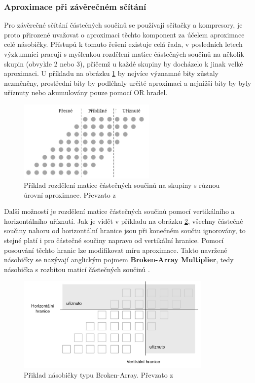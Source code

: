 \subsubsection{Aproximace při závěrečném sčítání}
Pro závěrečné sčítání částečných součinů se používají sčítačky a kompresory, je proto přirozené uvažovat o aproximaci těchto komponent za účelem aproximace celé násobičky. Přístupů k tomuto řešení existuje celá řada, v posledních letech výzkumníci pracují s myšlenkou rozdělení matice částečných součinů na několik skupin (obvykle 2 nebo 3), přičemž u každé skupiny by docházelo k jinak velké aproximaci. U příkladu na obrázku \ref{fig:accumulation_approx} by nejvíce významné bity zůstaly nezměněny, prostřední bity by podléhaly určité aproximaci a nejnižší bity by byly uříznuty nebo akumulovány pouze pomocí OR hradel.

\begin{figure}[H]
    \centering
    \includegraphics[width=0.6\textwidth]{obrazky-figures/accumulation_approx.png}
    \caption{Příklad rozdělení matice částečných součinů na skupiny s různou úrovní aproximace. Převzato z \cite{approx_mult_survey}}
    \label{fig:accumulation_approx}
\end{figure}

Další možností je rozdělení matice částečných součinů pomocí vertikálního a horizontálního uříznutí. Jak je vidět v příkladu na obrázku \ref{fig:bam}, všechny částečné součiny nahoru od horizontální hranice jsou při konečném součtu ignorovány, to stejné platí i pro částečné součiny napravo od vertikální hranice. Pomocí posouvání těchto hranic lze modifikovat míru aproximace. Takto navržené násobičky se nazývají anglickým pojmem \textbf{Broken-Array Multiplier}, tedy násobička s rozbitou maticí částečných součinů \cite{bio_inspired_blocks}. 

\begin{figure}[H]
    \centering
    \includegraphics[width=0.85\textwidth]{obrazky-figures/bam.png}
    \caption{Přiklad násobičky typu Broken-Array. Převzato z \cite{bio_inspired_blocks}}
    \label{fig:bam}
\end{figure}

